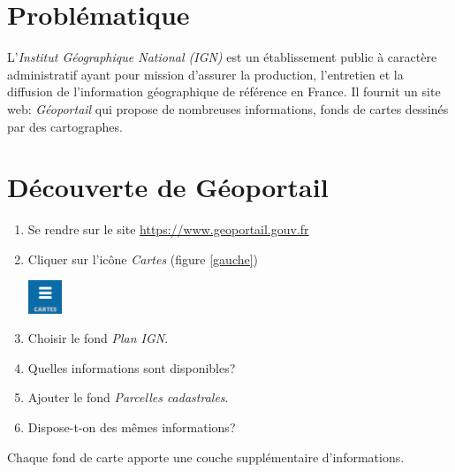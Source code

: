 \documentclass[a4paper,11pt]{article}
\begin{document}
\section{Problématique}
L'\emph{Institut Géographique National (IGN)} est un établissement public à caractère administratif ayant pour mission d'assurer la production, l'entretien et la diffusion de l'information géographique de référence en France. Il fournit un site web: \emph{Géoportail} qui propose de nombreuses informations, fonds de cartes dessinés par des cartographes.
\begin{center}
\end{center}
\section{Découverte de Géoportail}
\begin{activite}
\begin{enumerate}
    \item Se rendre sur le site \url{https://www.geoportail.gouv.fr}
    \item Cliquer sur l'icône \emph{Cartes} (figure \ref{gauche})
    \begin{center}
    \centering
    \includegraphics[width=1cm]{ressources/gauche.png}
    \label{gauche}
    \end{center}
    \item Choisir le fond \emph{Plan IGN}.
    \item Quelles informations sont disponibles?
    \item Ajouter le fond \emph{Parcelles cadastrales}.
    \item Dispose-t-on des mêmes informations?
\end{enumerate}
\end{activite}
\begin{aretenir}[]
Chaque fond de carte apporte une couche supplémentaire d'informations. 
\end{aretenir}
\end{document}
